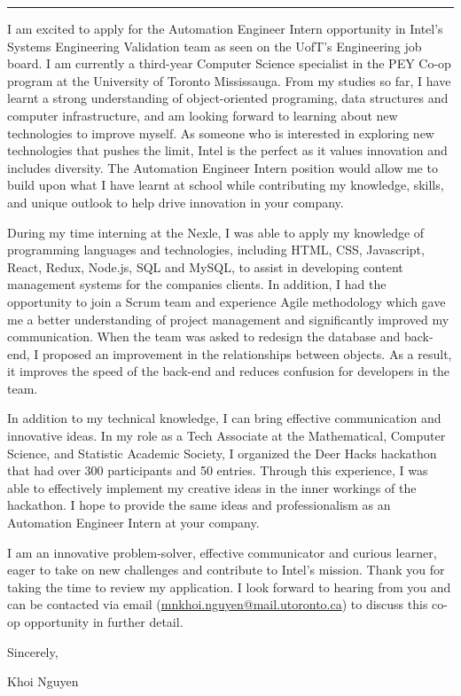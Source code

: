 \documentclass[
	12pt, %
]{resume} %
\begin{document}
    \medskip
    \hrule %
    \medskip
    
    I am excited to apply for the Automation Engineer Intern opportunity in Intel's Systems Engineering Validation team as seen on the UofT's Engineering job board. I am currently a third-year Computer Science specialist in the PEY Co-op program at the University of Toronto Mississauga. From my studies so far, I have learnt a strong understanding of object-oriented programing, data structures and computer infrastructure, and am looking forward to learning about new technologies to improve myself. As someone who is interested in exploring new technologies that pushes the limit, Intel is the perfect as it values innovation and includes diversity. The Automation Engineer Intern position would allow me to build upon what I have learnt at school while contributing my knowledge, skills, and unique outlook to help drive innovation in your company.

    During my time interning at the Nexle, I was able to apply my knowledge of programming languages and technologies, including HTML, CSS, Javascript, React, Redux, Node.js, SQL and MySQL, to assist in developing content management systems for the companies clients. In addition, I had the opportunity to join a Scrum team and experience Agile methodology which gave me a better understanding of project management and significantly improved my communication. When the team was asked to redesign the database and back-end, I proposed an improvement in the relationships between objects. As a result, it improves the speed of the back-end and reduces confusion for developers in the team.

    In addition to my technical knowledge, I can bring effective communication and innovative ideas. In my role as a Tech Associate at the Mathematical, Computer Science, and Statistic Academic Society,  I organized the Deer Hacks hackathon that had over 300 participants and 50 entries. Through this experience, I was able to effectively implement my creative ideas in the inner workings of the hackathon. I hope to provide the same ideas and professionalism as an Automation Engineer Intern at your company.

    I am an innovative problem-solver, effective communicator and curious learner, eager to take on new challenges and contribute to Intel's mission. Thank you for taking the time to review my application. I look forward to hearing from you and can be contacted via email (\href{mailto:mnkhoi.nguyen@mail.utoronto.ca}{mnkhoi.nguyen@mail.utoronto.ca}) to discuss this co-op opportunity in further detail.

    Sincerely,

    Khoi Nguyen
\end{document}
